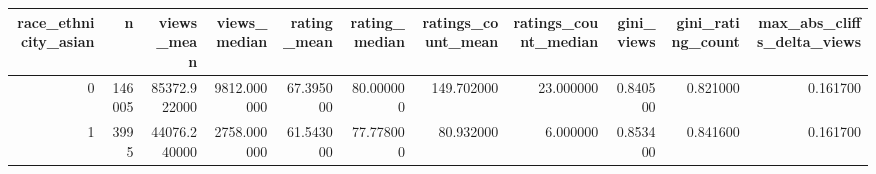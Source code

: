 \begin{tabular}{rrrrrrrrrrr}
\toprule
race_ethnicity_asian & n & views_mean & views_median & rating_mean & rating_median & ratings_count_mean & ratings_count_median & gini_views & gini_rating_count & max_abs_cliffs_delta_views \\
\midrule
0 & 146005 & 85372.922000 & 9812.000000 & 67.395000 & 80.000000 & 149.702000 & 23.000000 & 0.840500 & 0.821000 & 0.161700 \\
1 & 3995 & 44076.240000 & 2758.000000 & 61.543000 & 77.778000 & 80.932000 & 6.000000 & 0.853400 & 0.841600 & 0.161700 \\
\bottomrule
\end{tabular}
